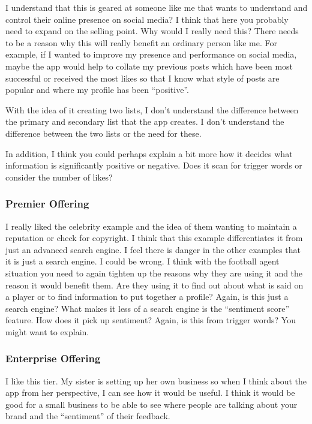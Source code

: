       I understand that this is geared at someone like me that wants to understand and control their online presence on social media? I think that here you probably need to expand on the selling point. Why would I really need this? There needs to be a reason why this will really benefit an ordinary person like me. For example, if I wanted to improve my presence and performance on social media, maybe the app would help to collate my previous posts which have been most successful or received the most likes so that I know what style of posts are popular and where my profile has been ``positive''.

      With the idea of it creating two lists, I don't understand the difference between the primary and secondary list that the app creates. I don't understand the difference between the two lists or the need for these.

      In addition, I think you could perhaps explain a bit more how it decides what information is significantly positive or negative. Does it scan for trigger words or consider the number of likes?

    \subsubsection{Premier Offering}

      I really liked the celebrity example and the idea of them wanting to maintain a reputation or check for copyright. I think that this example differentiates it from just an advanced search engine. I feel there is danger in the other examples that it is just a search engine. I could be wrong. I think with the football agent situation you need to again tighten up the reasons why they are using it and the reason it would benefit them. Are they using it to find out about what is said on a player or to find information to put together a profile? Again, is this just a search engine? What makes it less of a search engine is the ``sentiment score'' feature. How does it pick up sentiment? Again, is this from trigger words? You might want to explain.

    \subsubsection{Enterprise Offering}

      I like this tier. My sister is setting up her own business so when I think about the app from her perspective, I can see how it would be useful. I think it would be good for a small business to be able to see where people are talking about your brand and the ``sentiment'' of their feedback.

